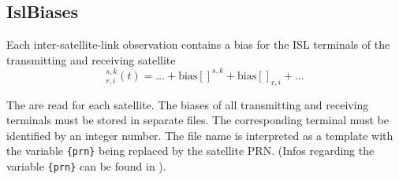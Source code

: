 \subsection{IslBiases}\label{gnssParametrizationType:islBiases}
Each inter-satellite-link observation contains a bias for the ISL terminals of the transmitting and receiving satellite
\begin{equation}
  []_{r,i}^{s,k}(t) = \dots + \text{bias}[]^{s,k} + \text{bias}[]_{r,i} + \dots
\end{equation}

The  are read
for each satellite. The biases of all transmitting and receiving terminals must be stored in separate files.
The corresponding terminal must be identified by an integer number.
The file name is interpreted as a template with the variable \verb|{prn}| being replaced by the satellite PRN.
(Infos regarding the variable \verb|{prn}| can be found in
).


